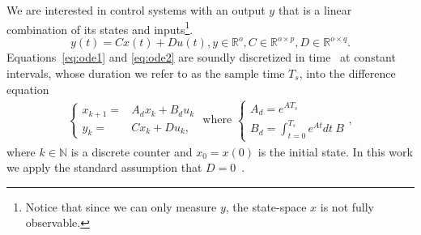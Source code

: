 \documentclass[sigconf]{llncs}
\newcommand{\mat}[1]{{#1}}
\renewcommand{\vec}[1]{{#1}}
\begin{document}
We are interested in control systems with an output $\vec{y}$ that is a
linear combination of its states and inputs\footnote{Notice that since we
can only measure $\vec{y}$, the state-space $\vec{x}$ is not fully
observable.}.
%
\begin{equation}
\label{eq:ode2}  
\vec{y}(t)=\mat{C}\vec{x}(t)+\mat{D}\vec{u}(t),
\vec{y} \in \mathbb{R}^o,
\mat{C} \in \mathbb{R}^{o \times p},
\mat{D} \in \mathbb{R}^{o \times q}. 
\end{equation}
%
Equations~\eqref{eq:ode1} and \eqref{eq:ode2} are soundly discretized in
time~\cite{middleton1990digital,van1978computing} at constant intervals,
whose duration we refer to as the sample time $T_s$, into the difference
equation
%
\begin{align}
\label{eq:plant}
\left\{
\begin{array}{rl}
\vec{x}_{k+1} =& \mat{A}_d \vec{x}_k+ \mat{B}_d \vec{u}_k\\
\vec{y}_{k} =& \mat{C} \vec{x}_k + \mat{D} \vec{u}_k, 
\end{array}
\right.
\text{ where }
\left\{
\begin{array}{l}
\mat{A}_d=e^{\mat{A}T_s}\\
\mat{B}_d = \int_{t = 0}^{T_s} e^{\mat{A} t} dt\ \mat{B}
\end{array}
\right.,
\end{align} 
%
%
where $k \in \mathbb N$ is a discrete counter and $\vec{x}_{0}=\vec{x}(0)$
is the initial state.  In this work we apply the standard assumption that
$\mat{D}=\mat{0}$~\cite{Astrom08}.
%

\end{document}
